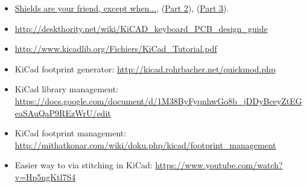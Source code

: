 \documentclass[12pt,letterpaper]{scrartcl}
\begin{document}
\begin{itemize}
	\item \href{http://www.edn.com/electronics-blogs/the-practicing-instrumentation-engineer/4418080/2/Shields-are-your-friend--except-when-}{Shields are your friend, except when...}, (\href{http://www.edn.com/electronics-blogs/the-practicing-instrumentation-engineer/4419228/2/Shields-are-your-friend--except-when---Part-2-}{Part 2}), (\href{}{Part 3}).
	\item \url{http://deskthority.net/wiki/KiCAD_keyboard_PCB_design_guide}

	\item \url{http://www.kicadlib.org/Fichiers/KiCad_Tutorial.pdf}

	\item KiCad footprint generator: \url{http://kicad.rohrbacher.net/quickmod.php}

	\item KiCad library management: \url{https://docs.google.com/document/d/1M38ByFyqnhwGo8b_jDDyBceyZtEGeaSAuQaP9REzWrU/edit}

	\item KiCad footprint management:
\url{http://mithatkonar.com/wiki/doku.php/kicad/footprint_management}

	\item Easier way to via stitching in KiCad: \url{https://www.youtube.com/watch?v=Hp5ngKtl7S4}
\end{itemize}


\newpage



\end{document}
